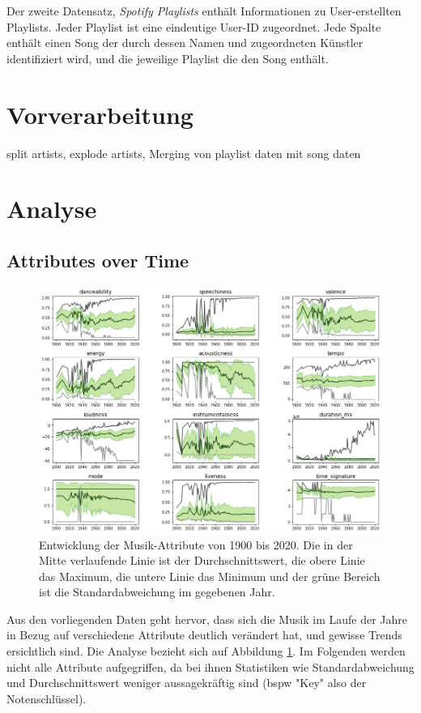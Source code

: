\documentclass[conference]{IEEEtran}
\begin{document}
Der zweite Datensatz, \textit{Spotify Playlists} \cite{d1} enthält Informationen zu User-erstellten Playlists. Jeder Playlist ist eine eindeutige User-ID zugeordnet. Jede Spalte enthält einen Song der durch dessen Namen und zugeordneten Künstler identifiziert wird, und die jeweilige Playlist die den Song enthält. 

\section{Vorverarbeitung}
split artists, explode artists, Merging von playlist daten mit song daten
\section{Analyse}
\subsection{Attributes over Time}
\begin{figure}[t]
\centering
\includegraphics[width=\textwidth]{images/over_time.png}
\caption{Entwicklung der Musik-Attribute von 1900 bis 2020. Die in der Mitte verlaufende Linie ist der Durchschnittswert, die obere Linie das Maximum, die untere Linie das Minimum und der grüne Bereich ist die Standardabweichung im gegebenen Jahr.}
\label{time}
\end{figure}
Aus den vorliegenden Daten geht hervor, dass sich die Musik im Laufe der Jahre in Bezug auf verschiedene Attribute deutlich verändert hat, und gewisse Trends ersichtlich sind. Die Analyse bezieht sich auf Abbildung \ref{time}. Im Folgenden werden nicht alle Attribute aufgegriffen, da bei ihnen Statistiken wie Standardabweichung und Durchschnittswert weniger aussagekräftig sind (bspw "Key" also der Notenschlüssel).
\end{document}

